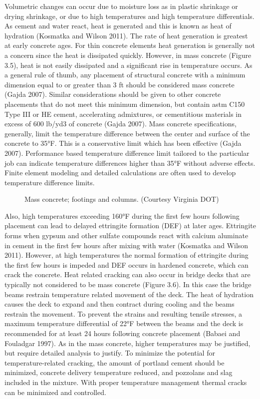 Volumetric changes can occur due to moisture loss as in plastic shrinkage or drying shrinkage, or due to high
temperatures and high temperature differentials. As cement and water react, heat is generated and this is known as
heat of hydration (Kosmatka and Wilson 2011). The rate of heat generation is greatest at early concrete ages. For
thin concrete elements heat generation is generally not a concern since the heat is dissipated quickly. However, in
mass concrete (Figure 3.5), heat is not easily dissipated and a significant rise in temperature occurs. As a general rule
of thumb, any placement of structural concrete with a minimum dimension equal to or greater than 3 ft should be
considered mass concrete (Gajda 2007). Similar considerations should be given to other concrete placements that do
not meet this minimum dimension, but contain \acrshort*{astm} C150 Type III or HE cement, accelerating admixtures, or
cementitious materials in excess of 600 lb/yd3 of concrete (Gajda 2007). Mass concrete specifications, generally,
limit the temperature difference between the center and surface of the concrete to 35°F. This is a conservative limit which has been effective (Gajda 2007). Performance based temperature difference limit tailored to the particular job
can indicate temperature differences higher than 35°F without adverse effects. Finite element modeling and detailed
calculations are often used to develop temperature difference limits.

\begin{figure}
  \caption{Mass concrete; footings and columns. (Courtesy Virginia DOT)}\label{fig:mass-concrete}
\end{figure}

Also, high temperatures exceeding 160°F during the first few hours following placement can lead to delayed
ettringite formation (DEF) at later ages. Ettringite forms when gypsum and other sulfate compounds react with
calcium aluminate in cement in the first few hours after mixing with water (Kosmatka and Wilson 2011). However,
at high temperatures the normal formation of ettringite during the first few hours is impeded and DEF occurs in
hardened concrete, which can crack the concrete. Heat related cracking can also occur in bridge decks that are
typically not considered to be mass concrete (Figure 3.6). In this case the bridge beams restrain temperature related
movement of the deck. The heat of hydration causes the deck to expand and then contract during cooling and the
beams restrain the movement. To prevent the strains and resulting tensile stresses, a maximum temperature
differential of 22°F between the beams and the deck is recommended for at least 24 hours following concrete
placement (Babaei and Fouladgar 1997). As in the mass concrete, higher temperatures may be justified, but require
detailed analysis to justify. To minimize the potential for temperature-related cracking, the amount of portland
cement should be minimized, concrete delivery temperature reduced, and pozzolans and slag included in the mixture.
With proper temperature management thermal cracks can be minimized and controlled.

